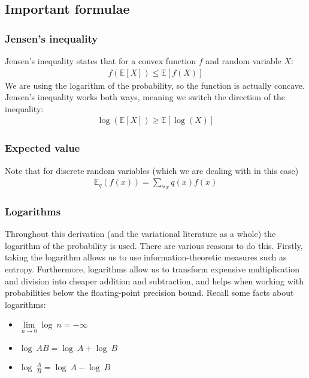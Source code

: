 \subsection{Important formulae}


\subsubsection{Jensen's inequality}
Jensen’s inequality states that for a convex function $f $ and random
variable $X$: 
\begin{align}
f(\mathbb{E}[X]) \leq \mathbb{E}[f(X)] 
\end{align}
We are using the logarithm of the probability, so the function is actually concave. Jensen's inequality works both ways, meaning we switch the direction of the inequality:
    \begin{align}\log(\mathbb{E}[X]) \geq \mathbb{E}[\log(X)] \end{align}

\subsubsection{Expected value}
Note that for discrete random variables (which we are dealing with in this case)
\begin{align} \mathbb{E}_q(f(x)) = \sum\limits_{\forall x} q(x)f(x) \end{align}

\subsubsection{Logarithms}

Throughout this derivation (and the variational literature as a whole) the logarithm of the probability is used. There are various reasons to do this. Firstly, taking the logarithm allows us to use information-theoretic measures such as entropy. Furthermore, logarithms allow us to transform expensive multiplication and division into cheaper addition and subtraction, and helps when working with probabilities below the floating-point precision bound. Recall some facts about logarithms:

\begin{itemize}

\item $\lim\limits_{n\rightarrow 0} \log\ n = -\infty $
\item $\log\ AB = \log\ A + \log\ B $
\item $\log\ \frac{A}{B} = \log\ A - \log\ B $
\end{itemize}


